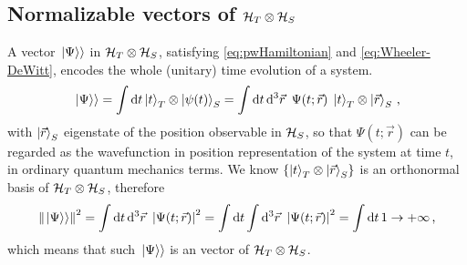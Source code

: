 

\subsection{Normalizable vectors of $\mathcal{H}_T \otimes \mathcal{H}_S$}
\label{sec:properpw}

A vector $\left.\left| \Psi \right\rangle\right\rangle$ in $\mathcal{H}_T \otimes \mathcal{H}_S$,
satisfying \eqref{eq:pwHamiltonian} and \eqref{eq:Wheeler-DeWitt},
encodes the whole (unitary) time evolution of a system.
\begin{equation}\label{eq:pwexpansion}
  \left.\left| \Psi \right\rangle\right\rangle =
    \int \dd{t} \ket{t}_T \otimes \ket{\psi(t)}_S =
    \int \dd{t}\dd[3]{\vec{r}} \ \Psi(t; \vec{r}) \; \ket{t}_T \otimes \ket{\vec{r}}_S
    \,  \text{,}
\end{equation}
with $\ket{\vec{r}}_S$ eigenstate of the position observable in $\mathcal{H}_S$,
so that $\Psi(t; \vec{r})$ can be regarded as the wavefunction in position representation of the system at time $t$,
in ordinary quantum mechanics terms.
We know $\left\{\ket{t}_T \otimes \ket{\vec{r}}_S\right\}$ is an orthonormal basis of $\mathcal{H}_T \otimes \mathcal{H}_S$, therefore
\begin{equation}
  \norm{\left.\left| \Psi \right\rangle\right\rangle}^2 =
    \int \dd{t}\dd[3]{\vec{r}} \ \abs{\Psi(t; \vec{r})}^2 =
    \int \dd{t} \int \dd[3]{\vec{r}} \ \abs{\Psi(t; \vec{r})}^2 =
    \int \dd{t} 1 \rightarrow +\infty
    \,  \text{,}
\end{equation}
which means that such $\left.\left| \Psi \right\rangle\right\rangle$ is an  vector of $\mathcal{H}_T \otimes \mathcal{H}_S$.

